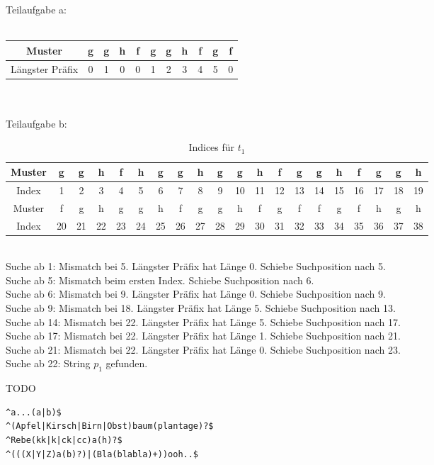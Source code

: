 \documentclass[12pt]{scrartcl}
\begin{document}

\exercise{}

Teilaufgabe a:\\\\
\begin{tabular}{|c|c|c|c|c|c|c|c|c|c|c|}
\hline 
Muster & g & g & h & f & g & g & h & f & g & f\\ 
\hline 
Längster Präfix & 0 & 1 & 0 & 0 & 1 & 2 & 3 & 4 & 5 & 0\\ 
\hline 
\end{tabular}
\\\\
Teilaufgabe b:
\begin{table}[h!]
\begin{tabular}{|c|c|c|c|c|c|c|c|c|c|c|c|c|c|c|c|c|c|c|c|}
\hline 
Muster & g&g&h&f&h&g&g&h&g&g&h&f&g&g&h&f&g&g&h\\ 
\hline 
Index  & 1&2&3&4&5&6&7&8&9&10&11&12&13&14&15&16&17&18&19\\
\hline
\hline
Muster &f&g&h&g&g&h&f&g&g&h&f&g&f&f&g&f&h&g&h\\
\hline
Index & 20&21&22&23&24&25&26&27&28&29&30&31&32&33&34&35&36&37&38\\ 
\hline
\end{tabular}
\caption{Indices für $t_1$}
\end{table}\\
Suche ab 1: Mismatch bei 5. Längster Präfix hat Länge 0. Schiebe Suchposition nach 5.\\
Suche ab 5: Mismatch beim ersten Index. Schiebe Suchposition nach 6.\\
Suche ab 6: Mismatch bei 9. Längster Präfix hat Länge 0. Schiebe Suchposition nach 9.\\
Suche ab 9: Mismatch bei 18. Längster Präfix hat Länge 5. Schiebe Suchposition nach 13.\\
Suche ab 14: Mismatch bei 22. Längster Präfix hat Länge 5. Schiebe Suchposition nach 17.\\
Suche ab 17: Mismatch bei 22. Längster Präfix hat Länge 1. Schiebe Suchposition nach 21.\\
Suche ab 21: Mismatch bei 22. Längster Präfix hat Länge 0. Schiebe Suchposition nach 23.\\
Suche ab 22: String $p_1$ gefunden.

\exercise{}
TODO

\exercise{}
\begin{lstlisting}
^a...(a|b)$
^(Apfel|Kirsch|Birn|Obst)baum(plantage)?$
^Rebe(kk|k|ck|cc)a(h)?$
^(((X|Y|Z)a(b)?)|(Bla(blabla)+))ooh..$
\end{lstlisting}



\end{document}
